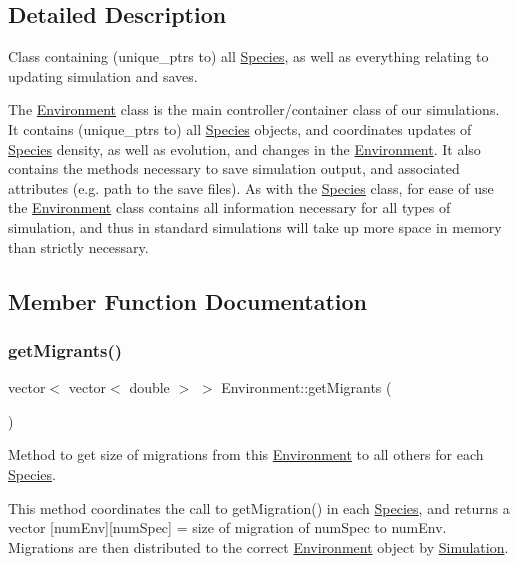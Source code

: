 \subsection{Detailed Description}
Class containing (unique\+\_\+ptrs to) all \hyperlink{classSpecies}{Species}, as well as everything relating to updating simulation and saves. 

The \hyperlink{classEnvironment}{Environment} class is the main controller/container class of our simulations. It contains (unique\+\_\+ptrs to) all \hyperlink{classSpecies}{Species} objects, and coordinates updates of \hyperlink{classSpecies}{Species} density, as well as evolution, and changes in the \hyperlink{classEnvironment}{Environment}. It also contains the methods necessary to save simulation output, and associated attributes (e.\+g. path to the save files). As with the \hyperlink{classSpecies}{Species} class, for ease of use the \hyperlink{classEnvironment}{Environment} class contains all information necessary for all types of simulation, and thus in standard simulations will take up more space in memory than strictly necessary. 

\subsection{Member Function Documentation}
\mbox{\label{classEnvironment_af85970e5c7ad4c80b9432cacbf6c2d2b}} 
\subsubsection{\texorpdfstring{get\+Migrants()}{getMigrants()}}
{\footnotesize\ttfamily vector$<$ vector$<$ double $>$ $>$ Environment\+::get\+Migrants (\begin{DoxyParamCaption}{ }\end{DoxyParamCaption})}



Method to get size of migrations from this \hyperlink{classEnvironment}{Environment} to all others for each \hyperlink{classSpecies}{Species}. 

This method coordinates the call to get\+Migration() in each \hyperlink{classSpecies}{Species}, and returns a vector \mbox{[}num\+Env\mbox{]}\mbox{[}num\+Spec\mbox{]} = size of migration of num\+Spec to num\+Env. Migrations are then distributed to the correct \hyperlink{classEnvironment}{Environment} object by \hyperlink{classSimulation}{Simulation}.

